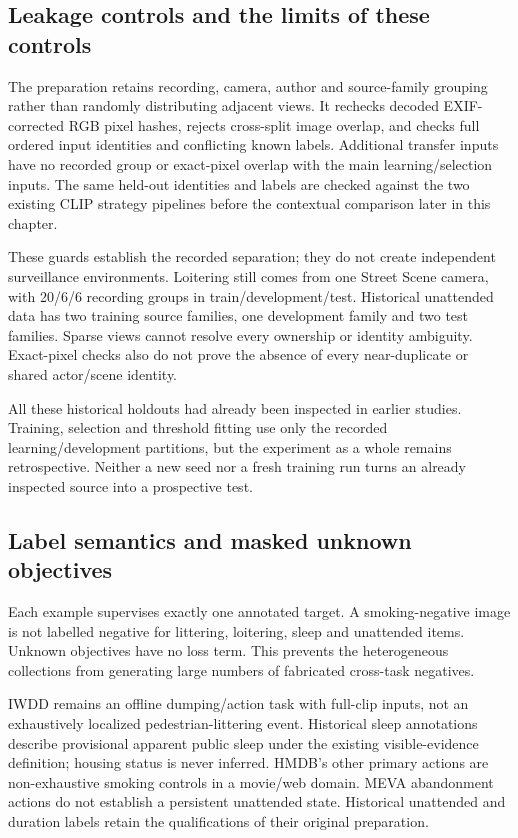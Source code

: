 \subsection{Leakage controls and the limits of these controls}
The preparation retains recording, camera, author and source-family grouping rather than randomly distributing adjacent views. It rechecks decoded EXIF-corrected RGB pixel hashes, rejects cross-split image overlap, and checks full ordered input identities and conflicting known labels. Additional transfer inputs have no recorded group or exact-pixel overlap with the main learning/selection inputs. The same held-out identities and labels are checked against the two existing CLIP strategy pipelines before the contextual comparison later in this chapter.

These guards establish the recorded separation; they do not create independent surveillance environments. Loitering still comes from one Street Scene camera, with 20/6/6 recording groups in train/development/test. Historical unattended data has two training source families, one development family and two test families. Sparse views cannot resolve every ownership or identity ambiguity. Exact-pixel checks also do not prove the absence of every near-duplicate or shared actor/scene identity.

All these historical holdouts had already been inspected in earlier studies. Training, selection and threshold fitting use only the recorded learning/development partitions, but the experiment as a whole remains retrospective. Neither a new seed nor a fresh training run turns an already inspected source into a prospective test.

\subsection{Label semantics and masked unknown objectives}
Each example supervises exactly one annotated target. A smoking-negative image is not labelled negative for littering, loitering, sleep and unattended items. Unknown objectives have no loss term. This prevents the heterogeneous collections from generating large numbers of fabricated cross-task negatives.

IWDD remains an offline dumping/action task with full-clip inputs, not an exhaustively localized pedestrian-littering event. Historical sleep annotations describe provisional apparent public sleep under the existing visible-evidence definition; housing status is never inferred. HMDB's other primary actions are non-exhaustive smoking controls in a movie/web domain. MEVA abandonment actions do not establish a persistent unattended state. Historical unattended and duration labels retain the qualifications of their original preparation.

